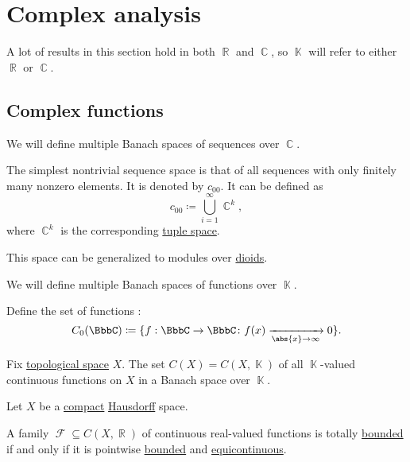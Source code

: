 \section{Complex analysis}\label{sec:complex_analysis}

A lot of results in this section hold in both \( \BbbR \) and \( \BbbC \), so \( \BbbK \) will refer to either \( \BbbR \) or \( \BbbC \).

\subsection{Complex functions}\label{subsec:complex_functions}

\begin{definition}\label{def:sequence_spaces}
  We will define multiple Banach spaces of sequences over \( \BbbC \).

  \begin{defenum}
     The simplest nontrivial sequence space is that of all sequences with only finitely many nonzero elements. It is denoted by \( c_{00} \). It can be defined as
    \begin{equation*}
      c_{00} \coloneqq \bigcup_{i=1}^\infty \BbbC^k,
    \end{equation*}
    where \( \BbbC^k \) is the corresponding \hyperref[def:left_module_of_tuples]{tuple space}.

    This space can be generalized to modules over \hyperref[def:left_module]{dioids}.
  \end{defenum}
\end{definition}

\begin{definition}\label{def:function_spaces}
  We will define multiple Banach spaces of functions over \( \BbbK \).

  \begin{defenum}
     Define the set of functions :
    \begin{equation*}
      C_0(\BbbC) \coloneqq \{ f: \BbbC \to \BbbC \colon f(x) \xrightarrow[\abs{x} \to \infty]{} 0 \}.
    \end{equation*}

     Fix \hyperref[def:topological_space]{topological space} \( X \). The set \( C(X) = C(X, \BbbK) \) of all \( \BbbK \)-valued continuous functions on \( X \) in a Banach space over \( \BbbK \).
  \end{defenum}
\end{definition}

\begin{theorem}\label{thm:arzela_ascoli}\mcite\cite[cor. 10.49]{Knapp2016BAlg}
  Let \( X \) be a \hyperref[def:compact_space]{compact} \hyperref[def:separation_axioms/T2]{Hausdorff} space.

  A family \( \mscrF \subseteq C(X, \BbbR) \) of continuous real-valued functions is totally \hyperref[def:totally_bounded_set]{bounded} if and only if it is pointwise \hyperref[def:bounded_function/pointwise]{bounded} and \hyperref[def:function_set_continuity/equicontinuous]{equicontinuous}.
\end{theorem}

